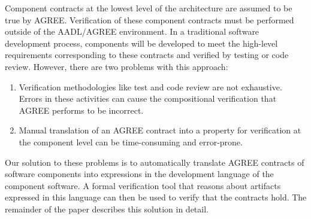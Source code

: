 Component contracts at the lowest level of the
architecture are assumed to be true by AGREE. Verification of these
component contracts must be performed outside of the AADL/AGREE environment.  
In a traditional software development process, components will be developed to meet
the high-level requirements corresponding to these contracts and verified by testing or code review.
However, there are two problems with this approach:

\begin{enumerate}
	\item Verification methodologies like test and code review are not exhaustive. 
	Errors in these activities can cause the compositional verification that 
	AGREE performs to be incorrect.
	\item Manual translation of an AGREE contract into a property for verification at the component level can be
	time-consuming and error-prone.
\end{enumerate}

Our solution to these problems is to automatically translate AGREE
contracts of software components into
expressions in the development language of the component software. A formal
verification tool that reasons about artifacts expressed in this
language can then be used to verify that the contracts hold. 
The remainder of the paper describes this solution in detail.
